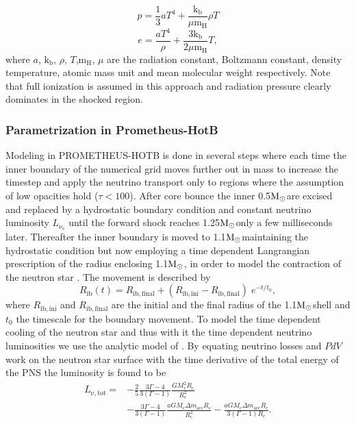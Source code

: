 \documentclass[fleqn,usenatbib]{mnras}
\newcommand{\solm}{\xspace\ensuremath{\rm{M_{\odot}}}}
\newcommand{\prom}{\textsc{P{\footnotesize ROMETHEUS}-H{\footnotesize OT}B}\xspace}
\begin{document}
\begin{equation}
    \label{equ:pressure-boltzmann-radiation}
    p = \frac{1}{3}aT^4 + \frac{\mathrm{k_b}}{\mu \mathrm{m_{H}}} \rho T
\end{equation}
\begin{equation}
    \label{equ:energy-boltzmann-radiation}
    e = \frac{aT^4}{\rho} + \frac{3\mathrm{k_b}}{2\mu \mathrm{m_{H}}} T,
\end{equation}
where $a$, $\mathrm{k_b}$, $\rho$, $T$,$\mathrm{m_{H}}$, $\mu$ are the radiation constant, Boltzmann constant, density temperature, atomic mass unit and mean molecular weight respectively. Note that full ionization is assumed in this approach and radiation pressure clearly dominates in the shocked region.

\subsubsection{Parametrization in Prometheus-HotB}
Modeling in \prom is done in several steps where each time the inner boundary of the numerical grid moves further out in mass to increase the timestep and apply the neutrino transport only to regions where the assumption of low opacities hold ($\tau < 100$).
After core bounce the inner 0.5\solm are excised and replaced by a hydrostatic boundary condition and constant neutrino luminosity $L_{\nu_{e}}$ until the forward shock reaches 1.25\solm only a few milliseconds later. Thereafter the inner boundary is moved to 1.1\solm maintaining the hydrostatic condition but now employing a time dependent Langrangian prescription of the radius enclosing 1.1\solm,  in order to model the contraction of the neutron star .
The movement is described by
\begin{equation}
    R_{\mathrm{ib}}(t) = R_{\mathrm{ib,final}} + (R_{\mathrm{ib,ini}} - R_{\mathrm{ib,final}})\; e^{-t/t_0},
\end{equation}
where $R_{\mathrm{ib,ini}}$ and $R_{\mathrm{ib,final}}$ are the initial and the final radius of the 1.1\solm shell and $t_0$ the timescale for the boundary movement. 
To model the time dependent cooling of the neutron star and thus with it the time dependent neutrino luminosities we use the analytic model of \cite{Ugliano2012}. By equating neutrino losses and $PdV$ work on the neutron star surface with the time derivative of the total energy of the PNS the luminosity is found to be
\begin{equation}
\begin{split}
\label{eqn:lib}
    L_{\mathrm{\nu,tot}} = & - \frac{2}{5} \frac{3\Gamma - 4}{3(\Gamma - 1)} \frac{GM^2_{\mathrm{c}} R_{\mathrm{c}}}{R_{\mathrm{c}}^2} \\
            &  - \frac{3\Gamma - 4} {3(\Gamma - 1)} \frac{aGM_{\mathrm{c}}\Delta m_{\mathrm{acc}}R_\mathrm{c}}{R^2_{\mathrm{c}}}  -\frac{aGM_{\mathrm{c}}\Delta m_{\mathrm{acc}}R_{\mathrm{c}}}{3(\Gamma - 1)R_{\mathrm{c}}}.
\end{split}
\end{equation}
\end{document}
